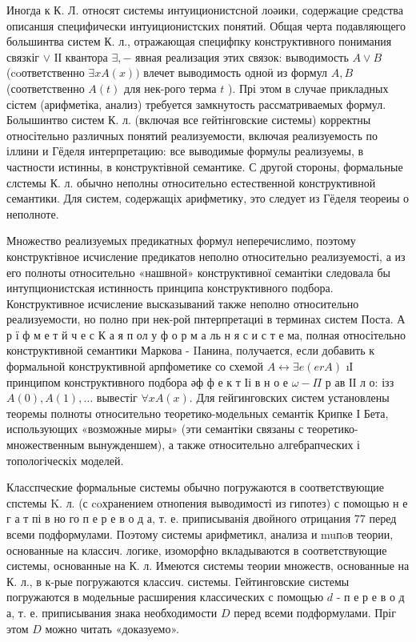 \documentclass[10pt]{article}
\begin{document}
Иногда к К. Л. относят системы интуиционистсной лоәики, содержацие средства описаншя специфически интуиционистских понятий. Общая черта подавляющего большинтва систем К. л., отражающая специфпку конструктивного понимания связкіг $\vee$ ІІ квантора $\exists,-$ явная реализация этих связок: выводимость $A \vee B$ (coответственно $\exists x A(x))$ влечет выводимость одноӥ из формул $A, B$ (соответственно $A(t)$ для нек-рого терма $t$ ). Прі этом в случае прикладных сістем (арифметіка, анализ) требуется замкнутость рассматриваемых формул. Болышинтво систем К. л. (включая все гейтінговские системы) корректны относітельно различных понятий реализуемости, включая реализуемость по іллини и Гёделя интерпретацию: все выводимые формулы реализуемы, в частности истинны, в конструктівной семантике. С другой стороны, формальные слстемы К. л. обычно неполны относительно естественной конструктивной семантики. Для систем, содержащіх арифметику, это следует из Гёделя теореиы о неполноте.



Множество реализуемых предикатных формул неперечислимо, поэтому конструктівное исчисление предикатов неполно относительно реализуемості, а из его полноты относительно «нашвной» конструктивної семантіки следовала бы интупционистская истинность принципа конструктивного подбора. Конструктивное исчисление высказываний также неполно относительно реализуемости, но полно при нек-рой пнтерпретациі в терминах систем Поста. А р ї ф м е т й ч е с К а я п ол у ф о р м а ль н я с и с т е ма, полная относітельно конструктивной семантики Маркова - IIанина, получается, если добавить к формальной конструктивной арпфометике со схемой $A \leftrightarrow \exists e(e r A)$ ıІ принципом конструктивного подбора әф ф е к т Іі в н о е $\omega-\Pi$ р ав ІІ л о: ізз $A(0), A(1), \ldots$ вывестіг $\forall x A(x)$. Для гейгинговских систем установлены теоремы полноты относительно теоретико-модельных семантік Крипке І Бета, использующих «возможные миры» (эти семантіки связаны с теоретико-множественным вынужденшем), а также относительно алгебрапческих і топологіческіх моделей.



Класспческие формальные системы обычно погружаются в соответствующие спстемы K. л. (с coхранением отнопения выводимості из гипотез) с помощью н е г а т пі в но го п е р е в о д а, т. е. приписыванія двойного отрицания 77 перед всеми подформулами. Поэтому системы арифметикл, анализа и muпoв теории, основанные на классич. логике, изоморфно вкладываются в соответствующие системы, основанные на К. л. Имеются системы теории множеств, основанные на К. л., в к-рые погружаются классич. системы. Гейтинговские системы погружаются в модельные расширения классических с помощью $d$ - п е р е в о д а, т. е. приписывания знака необходимости $D$ перед всеми подформулами. Пріг этом $D$ можно читать «доказуемо».
\end{document}
